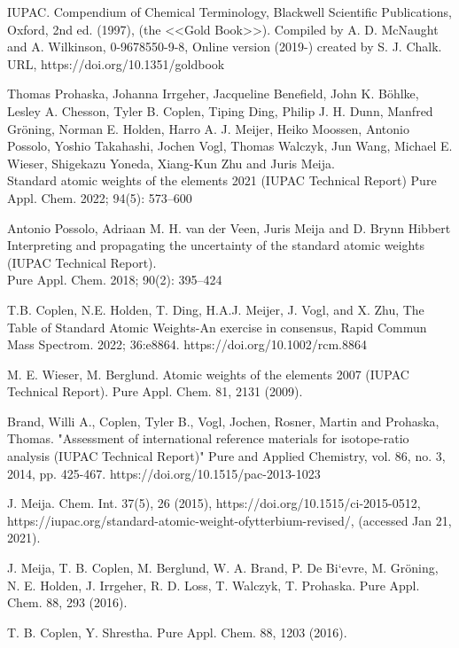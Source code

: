 \documentclass[a5paper,openany]{book}
\begin{document}
\begin{thebibliography}{00}
IUPAC. Compendium of Chemical Terminology, Blackwell Scientific Publications, Oxford, 2nd ed. (1997), (the <<Gold Book>>).
Compiled by A. D. McNaught and A. Wilkinson, 0-9678550-9-8, Online version (2019-) created by S. J. Chalk. URL, https://doi.org/10.1351/goldbook 

Thomas Prohaska, Johanna Irrgeher, Jacqueline Benefield, John K. Böhlke,
Lesley A. Chesson, Tyler B. Coplen, Tiping Ding, Philip J. H. Dunn, Manfred Gröning,
Norman E. Holden, Harro A. J. Meijer, Heiko Moossen, Antonio Possolo,
Yoshio Takahashi, Jochen Vogl, Thomas Walczyk, Jun Wang, Michael E. Wieser,
Shigekazu Yoneda, Xiang-Kun Zhu and Juris Meija. \\
Standard atomic weights of the elements 2021 (IUPAC Technical Report)
Pure Appl. Chem. 2022; 94(5): 573–600

Antonio Possolo, Adriaan M. H. van der Veen, Juris Meija and D. Brynn Hibbert
Interpreting and propagating the uncertainty of the standard atomic weights (IUPAC Technical Report). \\
Pure Appl. Chem. 2018; 90(2): 395–424

T.B. Coplen, N.E. Holden, T. Ding, H.A.J. Meijer, J. Vogl, and X. Zhu, The Table of Standard Atomic Weights-An exercise in consensus, Rapid Commun Mass Spectrom. 2022; 36:e8864.
https://doi.org/10.1002/rcm.8864

M. E. Wieser, M. Berglund. Atomic weights of the elements 2007 (IUPAC Technical Report). Pure Appl. Chem. 81, 2131 (2009).

Brand, Willi A., Coplen, Tyler B., Vogl, Jochen, Rosner, Martin and Prohaska, Thomas. "Assessment of international reference materials for isotope-ratio analysis (IUPAC Technical Report)" Pure and Applied Chemistry, vol. 86, no. 3, 2014, pp. 425-467. https://doi.org/10.1515/pac-2013-1023

 J. Meija. Chem. Int. 37(5), 26 (2015), https://doi.org/10.1515/ci-2015-0512, https://iupac.org/standard-atomic-weight-ofytterbium-revised/, (accessed Jan 21, 2021).

J. Meija, T. B. Coplen, M. Berglund, W. A. Brand, P. De Bi`evre, M. Gröning, N. E. Holden, J. Irrgeher, R. D. Loss, T. Walczyk, T. Prohaska. Pure Appl. Chem. 88, 293 (2016).

 T. B. Coplen, Y. Shrestha. Pure Appl. Chem. 88, 1203 (2016).


\end{thebibliography}
\end{document}
